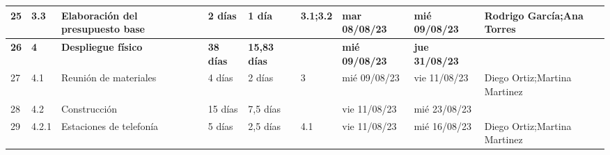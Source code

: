 \begin{landscape}
\begin{table}[p]
\begin{tabular}{|l|l|p{5.5cm}|l|l|l|l|l|p{5.5cm}|}
    25 & 3.3 & Elaboración del presupuesto base & 2 días & 1 día & 3.1;3.2 & mar 08/08/23 & mié 09/08/23 & Rodrigo García;Ana Torres \\ \hline
    \textbf{26} & \textbf{4} & \textbf{Despliegue físico} & \textbf{38 días} & \textbf{15,83 días} & \textbf{} & \textbf{mié 09/08/23} & \textbf{jue 31/08/23} & \textbf{} \\ \hline
    27 & 4.1 & Reunión de materiales & 4 días & 2 días & 3 & mié 09/08/23 & vie 11/08/23 & Diego Ortiz;Martina Martinez \\ \hline
    28 & 4.2 & Construcción & 15 días & 7,5 días &  & vie 11/08/23 & mié 23/08/23 &  \\ \hline
    29 & 4.2.1 & Estaciones de telefonía & 5 días & 2,5 días & 4.1 & vie 11/08/23 & mié 16/08/23 & Diego Ortiz;Martina Martinez \\ \hline
    \end{tabular}%
    \end{table}
\end{landscape}